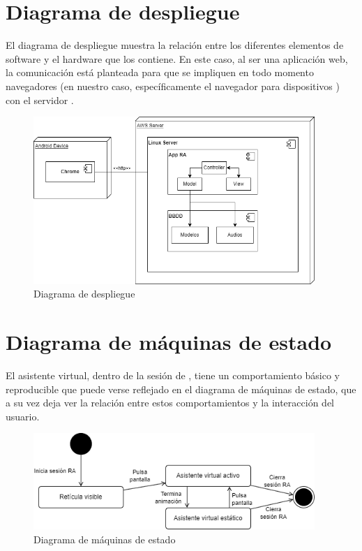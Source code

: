 \documentclass{subfiles}
\begin{document}
        \section{Diagrama de despliegue}
        \label{sec:diagrama_de_despliegue}
        
El diagrama de despliegue muestra la relación entre los diferentes elementos de software y el hardware que los contiene. En este caso, al ser una aplicación web, la comunicación está planteada para que se impliquen en todo momento navegadores (en nuestro caso, específicamente el navegador \googlechrome para dispositivos \android) con el servidor \aws.

\begin{figure}[ht]
\centering
\includegraphics[width=0.95\textwidth]{img/analisis_diagrama_de_despliegue.png}
\caption{Diagrama de despliegue}
\label{fig:analisis_diagrama_de_despliegue}
\end{figure}

\newpage
        \section{Diagrama de máquinas de estado}
        \label{sec:diagrama_de_maquinas_de_estado}
        
El asistente virtual, dentro de la sesión de \ra, tiene un comportamiento básico y reproducible que puede verse reflejado en el diagrama de máquinas de estado, que a su vez deja ver la relación entre estos comportamientos y la interacción del usuario.

\begin{figure}[ht]
\centering
\includegraphics[width=0.95\textwidth]{img/analisis_diagrama_maquinas_de_estado.png}
\caption{Diagrama de máquinas de estado}
\label{fig:analisis_diagrama_maquinas_de_estado}
\end{figure}
\end{document}
